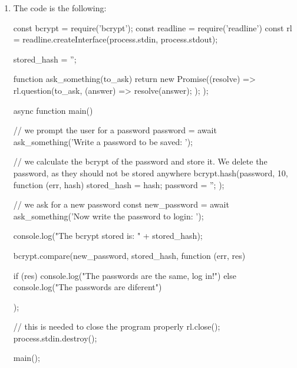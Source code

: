 \begin{Answer}[ref={basic-js-crypto-bcrypt}]
\begin{enumerate}[1.]
\item The code is the following: 

\begin{js}
const bcrypt = require('bcrypt');
const readline = require('readline')
const rl = readline.createInterface(process.stdin, process.stdout);

stored_hash = '';

function ask_something(to_ask) {
    return new Promise((resolve) => {
        rl.question(to_ask, (answer) => {
            resolve(answer);
        });
    });
}

async function main() {
    
    // we prompt the user for a password
    password = await ask_something('Write a password to be saved: ');

    // we calculate the bcrypt of the password and store it. We delete the password, as they should not be stored anywhere
    bcrypt.hash(password, 10, function (err, hash) {
        stored_hash = hash;
        password = '';
    });
    
    // we ask for a new password
    const new_password = await ask_something('Now write the password to login: ');

    console.log("The bcrypt stored is: " + stored_hash);

    bcrypt.compare(new_password, stored_hash, function (err, res) {

        if (res) {
            console.log("The passwords are the same, log in!")
        } else {
            console.log("The passwords are diferent")
        }
    });
  
    // this is needed to close the program properly
    rl.close();
    process.stdin.destroy();
}

main();
\end{js}
\end{enumerate}
\end{Answer}
